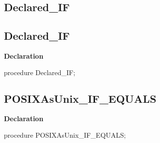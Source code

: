 \documentclass{report}
\newif\ifpdf
\begin{document}
\subsection*{\large{\textbf{Declared{\_}IF}}\normalsize\hspace{1ex}\hrulefill}
\else
\subsection*{Declared{\_}IF}
\fi
\label{ok_if_expressions-Declared_IF}
\begin{list}{}{
\setlength{\itemindent}{0cm}
\setlength{\listparindent}{0cm}
\setlength{\leftmargin}{\evensidemargin}
\addtolength{\leftmargin}{\tmplength}
\settowidth{\labelsep}{X}
\addtolength{\leftmargin}{\labelsep}
\setlength{\labelwidth}{\tmplength}
}
\item[\textbf{Declaration}\hfill]
\ifpdf
\begin{flushleft}
\fi
\begin{ttfamily}
procedure Declared{\_}IF;\end{ttfamily}

\ifpdf
\end{flushleft}
\fi

\end{list}
\ifpdf
\subsection*{\large{\textbf{POSIXAsUnix{\_}IF{\_}EQUALS}}\normalsize\hspace{1ex}\hrulefill}
\else
\subsection*{POSIXAsUnix{\_}IF{\_}EQUALS}
\fi
\label{ok_if_expressions-POSIXAsUnix_IF_EQUALS}
\begin{list}{}{
\setlength{\itemindent}{0cm}
\setlength{\listparindent}{0cm}
\setlength{\leftmargin}{\evensidemargin}
\addtolength{\leftmargin}{\tmplength}
\settowidth{\labelsep}{X}
\addtolength{\leftmargin}{\labelsep}
\setlength{\labelwidth}{\tmplength}
}
\item[\textbf{Declaration}\hfill]
\ifpdf
\begin{flushleft}
\fi
\begin{ttfamily}
procedure POSIXAsUnix{\_}IF{\_}EQUALS;\end{ttfamily}

\ifpdf
\end{flushleft}
\fi

\end{list}
\ifpdf
\end{document}

